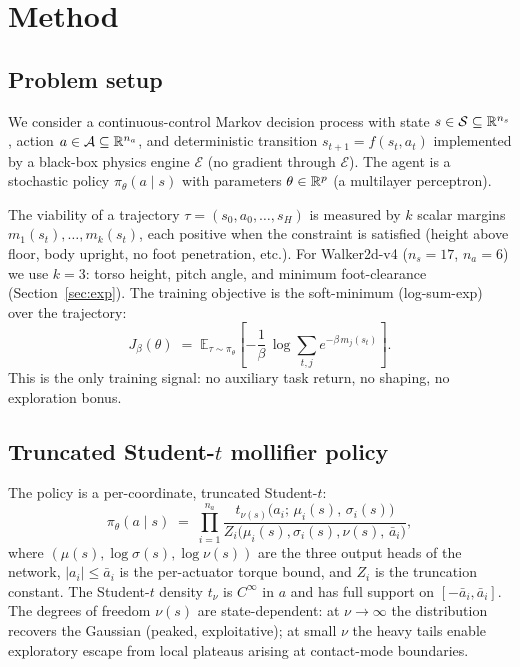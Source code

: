 \section{Method}
\label{sec:method}

\subsection{Problem setup}
\label{sec:setup}

We consider a continuous-control Markov decision process with state $s \in
\mathcal{S} \subseteq \mathbb{R}^{n_s}$, action $a \in \mathcal{A} \subseteq \mathbb{R}^{n_a}$,
and deterministic transition $s_{t+1} = f(s_t, a_t)$ implemented by a
black-box physics engine $\mathcal{E}$ (no gradient through $\mathcal{E}$).
The agent is a stochastic policy $\pi_\theta(a \mid s)$ with parameters
$\theta \in \mathbb{R}^p$ (a multilayer perceptron).

The viability of a trajectory $\tau = (s_0, a_0, \dots, s_H)$ is measured by
$k$ scalar margins $m_1(s_t), \dots, m_k(s_t)$, each positive when the
constraint is satisfied (height above floor, body upright, no foot
penetration, etc.). For Walker2d-v4 ($n_s = 17$, $n_a = 6$) we use $k = 3$:
torso height, pitch angle, and minimum foot-clearance
(Section~\ref{sec:exp}). The training objective is the soft-minimum
(log-sum-exp) over the trajectory:
\begin{equation}
  \label{eq:soft-margin}
  J_\beta(\theta) \;=\;
  \mathbb{E}_{\tau \sim \pi_\theta}\!\left[
    -\frac{1}{\beta}\,\log\sum_{t,j} e^{-\beta\, m_j(s_t)}
  \right].
\end{equation}
This is the only training signal: no auxiliary task return, no shaping, no
exploration bonus.

\subsection{Truncated Student-$t$ mollifier policy}
\label{sec:mollifier}

The policy is a per-coordinate, truncated Student-$t$:
\begin{equation}
  \label{eq:mollifier}
  \pi_\theta(a \mid s) \;=\;
  \prod_{i=1}^{n_a}
  \frac{t_{\nu(s)}\!\bigl(a_i;\, \mu_i(s),\, \sigma_i(s)\bigr)}
       {Z_i\bigl(\mu_i(s), \sigma_i(s), \nu(s),\, \bar a_i\bigr)},
\end{equation}
where $(\mu(s), \log\sigma(s), \log\nu(s))$ are the three output heads of
the network, $|a_i| \le \bar a_i$ is the per-actuator torque bound, and
$Z_i$ is the truncation constant. The Student-$t$ density $t_\nu$ is
$C^\infty$ in $a$ and has full support on $[-\bar a_i, \bar a_i]$. The
degrees of freedom $\nu(s)$ are state-dependent: at $\nu \to \infty$ the
distribution recovers the Gaussian (peaked, exploitative); at small
$\nu$ the heavy tails enable exploratory escape from local plateaus
arising at contact-mode boundaries.

